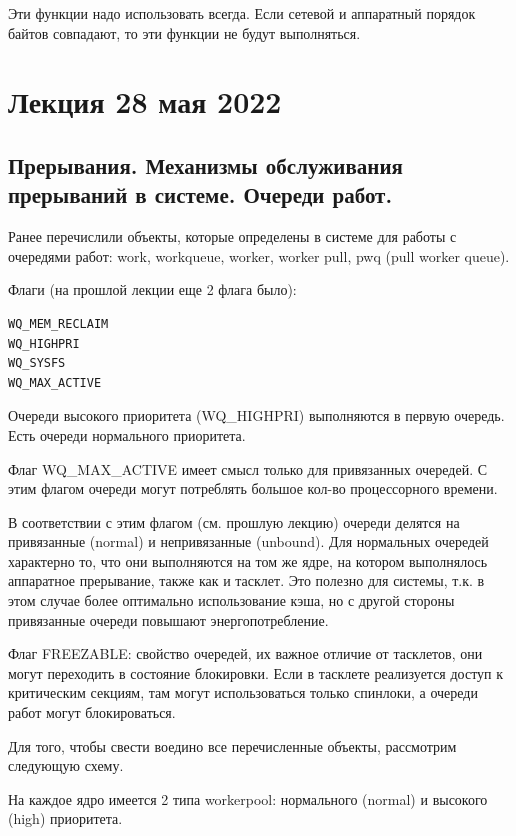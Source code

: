 \documentclass[12pt,a4paper]{scrreprt}
\begin{document}
Эти функции надо использовать всегда. Если сетевой и аппаратный порядок байтов совпадают, то эти функции не будут выполняться.

\chapter{\textbf{Лекция 28 мая 2022}}

\section{Прерывания. Механизмы обслуживания прерываний в системе. Очереди работ.}

Ранее перечислили объекты, которые определены в системе для работы с очередями работ: work, workqueue, worker, worker pull, pwq (pull worker queue).

Флаги (на прошлой лекции еще 2 флага было):

\begin{lstlisting}[language=C]
WQ_MEM_RECLAIM
WQ_HIGHPRI
WQ_SYSFS
WQ_MAX_ACTIVE
\end{lstlisting}

Очереди высокого приоритета (WQ\_HIGHPRI) выполняются в первую очередь. Есть очереди нормального приоритета.

Флаг WQ\_MAX\_ACTIVE имеет смысл только для привязанных очередей. С этим флагом очереди могут потреблять большое кол-во процессорного времени.

В соответствии с этим флагом (см. прошлую лекцию) очереди делятся на привязанные (normal) и непривязанные (unbound). Для нормальных очередей характерно то, что они выполняются на том же ядре, на котором выполнялось аппаратное прерывание, также как и тасклет. Это полезно для системы, т.к. в этом случае более оптимально использование кэша, но с другой стороны привязанные очереди повышают энергопотребление.

Флаг FREEZABLE: свойство очередей, их важное отличие от тасклетов, они могут переходить в состояние блокировки. Если в тасклете реализуется доступ к критическим секциям, там могут использоваться только спинлоки, а очереди работ могут блокироваться.

Для того, чтобы свести воедино все перечисленные объекты, рассмотрим следующую схему.

На каждое ядро имеется 2 типа workerpool: нормального (normal) и высокого (high) приоритета.

\begin{figure}[!h]
\end{figure}
\end{document}

